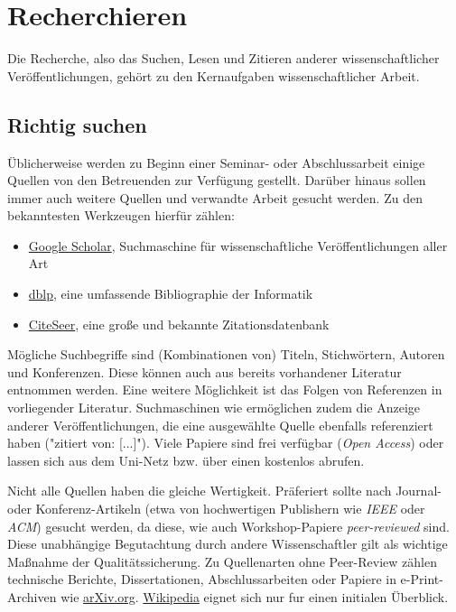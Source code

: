 \section{Recherchieren}
\label{sec:Recherchieren}

Die Recherche, also das Suchen, Lesen und Zitieren anderer wissenschaftlicher Veröffentlichungen, gehört zu den Kernaufgaben wissenschaftlicher Arbeit.

\subsection{Richtig suchen}
\label{sec:Recherchieren:Suchen}

Üblicherweise werden zu Beginn einer Seminar- oder Abschlussarbeit einige Quellen von den Betreuenden zur Verfügung gestellt. Darüber hinaus sollen immer auch weitere Quellen und verwandte Arbeit gesucht werden. Zu den bekanntesten Werkzeugen hierfür zählen:

\smallskip

\begin{itemize}[label={\faWrench}]
    \item \href{https://scholar.google.com/}{Google Scholar}, Suchmaschine für wissenschaftliche Veröffentlichungen aller Art
    \item \href{https://dblp.org/}{dblp}, eine umfassende Bibliographie der Informatik
    \item \href{https://citeseerx.ist.psu.edu/}{CiteSeer}, eine große und bekannte Zitationsdatenbank 
\end{itemize}

\smallskip

\noindent
Mögliche Suchbegriffe sind (Kombinationen von) Titeln, Stichwörtern, Autoren und Konferenzen. Diese können auch aus bereits vorhandener Literatur entnommen werden. Eine weitere Möglichkeit ist das Folgen von Referenzen in vorliegender Literatur. Suchmaschinen wie  ermöglichen zudem die Anzeige anderer Veröffentlichungen, die eine ausgewählte Quelle ebenfalls referenziert haben ("zitiert von: [...]"). Viele Papiere sind frei verfügbar (\emph{Open Access}) oder lassen sich aus dem Uni-Netz bzw. über einen  kostenlos abrufen.

Nicht alle Quellen haben die gleiche Wertigkeit. Präferiert sollte nach Journal- oder Konferenz-Artikeln (etwa von hochwertigen Publishern wie \emph{IEEE} oder \emph{ACM}) gesucht werden, da diese, wie auch Workshop-Papiere \emph{peer-reviewed} sind. Diese unabhängige Begutachtung durch andere Wissenschaftler gilt als wichtige Maßnahme der Qualitätssicherung. Zu Quellenarten ohne Peer-Review zählen technische Berichte, Dissertationen, Abschlussarbeiten oder Papiere in e-Print-Archiven wie \href{https://arXiv.org}{arXiv.org}. 
\href{https://www.wikipedia.org/}{Wikipedia} eignet sich nur fur einen initialen Überblick.

